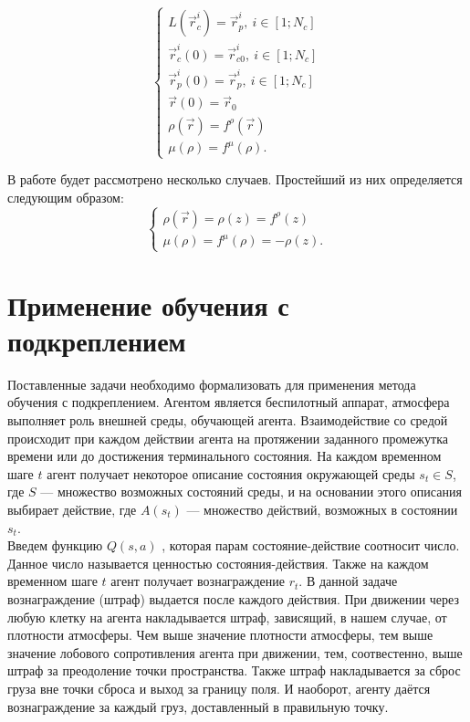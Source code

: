 \documentclass[12pt, a4paper]{report}
\theoremstyle{definition}
\theoremstyle{plain}
\theoremstyle{remark}
\theoremstyle{remark}
\theoremstyle{definition}
\begin{document}
\begin{equation*}
\begin{cases}
	L(\vec{r}_{c}^{i}) = \vec{r}_{p}^{i},\ i \in [1;N_{c}]\\
	\vec{r}_{c}^{i} (0) = \vec{r}_{c0}^{i},\ i \in [1;N_{c}]\\
	\vec{r}_{p}^{i} (0) = \vec{r}_{p}^{i},\ i \in [1;N_{c}]\\
	\vec{r}(0) = \vec{r}_{0} \\
	\rho (\vec{r})= f^{\rho}(\vec{r}) \\
	\mu (\rho)= f^{\mu}(\rho).
\end{cases}	
\end{equation*}

В работе будет рассмотрено несколько случаев. Простейший из них определяется следующим образом:
\begin{equation*}
\begin{cases}
\rho (\vec{r}) = \rho (z) = f^{\rho}(z) \\
\mu (\rho) = f^{\mu}(\rho) = -\rho (z).
\end{cases}	
\end{equation*}

\section{Применение обучения с подкреплением}

Поставленные задачи необходимо формализовать для применения метода обучения с подкреплением. Агентом является беспилотный аппарат, атмосфера выполняет роль внешней среды, обучающей агента. Взаимодействие со средой происходит при каждом действии агента на протяжении заданного промежутка времени или до достижения терминального состояния. На каждом временном шаге $ t $ агент получает некоторое описание состояния окружающей среды $ s_{t} \in S$, где $ S $ — множество возможных состояний среды, и на основании этого описания выбирает действие, где $ A(s_{t}) $ — множество действий, возможных в состоянии $s_{t}$.\\

Введем функцию $Q(s,a)$ , которая парам состояние-действие соотносит число. Данное число называется ценностью состояния-действия. Также на каждом временном шаге $t$ агент получает вознаграждение $ r_{t} $. В данной задаче вознаграждение (штраф) выдается после каждого действия. При движении через любую клетку на агента накладывается штраф, зависящий, в нашем случае, от плотности атмосферы. Чем выше значение плотности атмосферы, тем выше значение лобового сопротивления агента при движении, тем, соотвестенно, выше штраф за преодоление точки пространства. Также штраф накладывается за сброс груза вне точки сброса и выход за границу поля. И наоборот, агенту даётся вознаграждение за каждый груз, доставленный в правильную точку.\\
\end{document}
